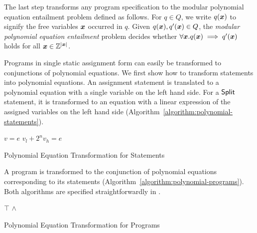 
The last step transforms any program specification to the 
modular polynomial equation entailment problem defined as follows. For
$q \in Q$, we write $q(\vx)$ to signify the free variables $\vx$
occurred in $q$. Given $q(\vx), q'(\vx) \in Q$, the \emph{modular
  polynomial equation entailment} problem decides whether $\forall
\vx. q(\vx) \implies q'(\vx)$ holds for all $\vx \in \bbfZ^{|\vx|}$.

Programs in single static assignment form can easily be transformed to
conjunctions of polynomial equations. We first show how to transform
statements into polynomial equations. An assignment statement is
translated to a polynomial equation with a single variable on the left
hand side. For a $\mbox{\textsf{Split}}$ statement, it is transformed to an
equation with a linear expression of the assigned variables on the
left hand side (Algorithm~\ref{algorithm:polynomial-statements}). 
\begin{algorithm}
  \begin{algorithmic}[1]
        \Return $v = e$
      \EndCase
        \Return $v_l + 2^n v_h = e$
      \EndCase
    \EndMatch
    \EndFunction
  \end{algorithmic}
  \caption{Polynomial Equation Transformation for Statements}
  \label{algorithm:polynomial-statements}
\end{algorithm}

A program is transformed to the conjunction of polynomial
equations corresponding to its statements
(Algorithm~\ref{algorithm:polynomial-programs}). Both algorithms are
specified straightforwardly in \coq.

\begin{algorithm}
  \begin{algorithmic}[1]
      \Case{$\epsilon$} \Return $\top$ \EndCase
        \Return {} $\wedge$
      \EndCase
    \EndMatch
    \EndFunction
  \end{algorithmic}
  \caption{Polynomial Equation Transformation for Programs}
  \label{algorithm:polynomial-programs}
\end{algorithm}

